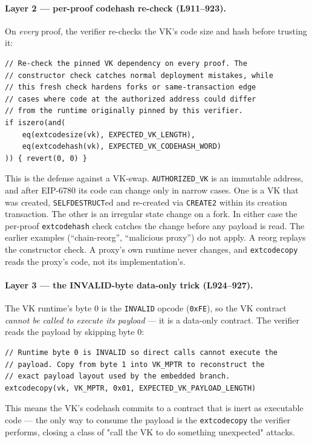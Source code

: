 \paragraph{Layer 2 --- per-proof codehash re-check (L911--923).}
On \emph{every} proof, the verifier re-checks the VK's code size
and hash before trusting it:
\begin{lstlisting}[style=yul]
// Re-check the pinned VK dependency on every proof. The
// constructor check catches normal deployment mistakes, while
// this fresh check hardens forks or same-transaction edge
// cases where code at the authorized address could differ
// from the runtime originally pinned by this verifier.
if iszero(and(
    eq(extcodesize(vk), EXPECTED_VK_LENGTH),
    eq(extcodehash(vk), EXPECTED_VK_CODEHASH_WORD)
)) { revert(0, 0) }
\end{lstlisting}
This is the defense against a VK-swap. \texttt{AUTHORIZED\_VK} is
an immutable address, and after EIP-6780 its code can change only in
narrow cases. One is a VK that was created, \texttt{SELFDESTRUCT}ed
and re-created via \texttt{CREATE2} within its creation transaction.
The other is an irregular state change on a fork. In either case the
per-proof \texttt{extcodehash} check catches the change before any
payload is read.  The earlier examples
(``chain-reorg'', ``malicious proxy'') do not apply. A reorg replays
the constructor check. A proxy's own runtime never changes, and
\texttt{extcodecopy} reads the proxy's code, not its
implementation's.

\paragraph{Layer 3 --- the INVALID-byte data-only trick (L924--927).}
The VK runtime's byte 0 is the \texttt{INVALID} opcode
(\texttt{0xFE}), so the VK contract \emph{cannot be called to
execute its payload} --- it is a data-only contract. The verifier
reads the payload by skipping byte 0:
\begin{lstlisting}[style=yul]
// Runtime byte 0 is INVALID so direct calls cannot execute the
// payload. Copy from byte 1 into VK_MPTR to reconstruct the
// exact payload layout used by the embedded branch.
extcodecopy(vk, VK_MPTR, 0x01, EXPECTED_VK_PAYLOAD_LENGTH)
\end{lstlisting}
This means the VK's codehash commits to a contract that is inert as
executable code --- the only way to consume the payload is the
\texttt{extcodecopy} the verifier performs, closing a class of
"call the VK to do something unexpected" attacks.

